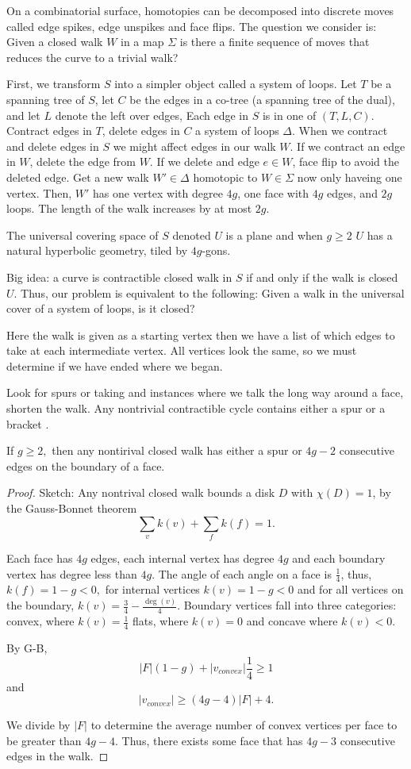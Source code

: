 On a combinatorial surface, homotopies can be decomposed
into discrete moves called edge spikes, edge unspikes  and face flips.
The question we consider is: Given a closed walk $W$ in a map $\Sigma$ is there a finite
sequence of moves that reduces the curve to a trivial walk?


First, we transform $S$ into a simpler object called a system of loops.  
Let $T$ be a spanning tree of $S$, let $C$ be the edges in a co-tree
(a spanning tree of the dual), and let $L$ denote the left over edges,
Each edge in $S$ is in one of $(T,L,C)$.
Contract edges in $T$, delete edges in $C$ a system of loops $\Delta$.
When we contract and delete edges in $S$ we might affect edges in our walk $W$.
If we contract an edge in $W$, delete the edge from $W$.
If we delete and edge $e\in W$, face flip to avoid the deleted edge.
Get a new walk $W' \in \Delta$ homotopic to $W\in \Sigma$
now only haveing one vertex. Then, $W'$ has one vertex
with degree $4g$, one face with $4g$ edges, and $2g$ loops.
The length of the walk increases by at most $2g$.


The universal covering space of $S$ denoted $U$ is a plane
and when $g\geq 2$ $U$ has a natural hyperbolic geometry,
tiled by $4g$-gons.


Big idea: a curve is contractible closed walk in $S$
if and only if the walk is closed $U$.
Thus, our problem is equivalent to the following: Given a walk
in the universal cover of a system of loops, is it closed?

Here the walk is given as a starting vertex then we have a list of which
edges to take at each intermediate vertex. 
All vertices look the same, so we must determine if we have ended where
we began. 

Look for spurs or taking and instances where we talk the long way around a face, 
shorten the walk.
Any nontrivial contractible cycle contains either a spur or a bracket \cite{gertsen-short-1990}.
\begin{lemma}\label{lem:dehn}
If $g\geq 2,$ then any nontirival closed walk has either a spur
or $4g-2$ consecutive edges on the boundary of a face.
\end{lemma}
\begin{proof}
Sketch: 
Any nontrival closed walk bounds a disk $D$ with $\chi(D)=1$, by the Gauss-Bonnet theorem
$$\sum_v k(v)+\sum_f k(f) =1.$$

Each face has $4g$ edges, each internal vertex has degree $4g$
and each  boundary vertex  has degree less than $4g$.
The angle of each angle on a face  is $\frac{1}{4}$,
thus, $k(f)=1-g<0,$ for internal vertices  $k(v)=1-g<0$ and for all
vertices on the boundary, $k(v)=\frac{3}{4}-\frac{\deg(v)}{4}$.
Boundary vertices fall into three  categories: convex, where $k(v)=\frac{1}{4}$
flats,  where $k(v)=0$  and concave where $k(v)<0$.

By G-B, $$|F|(1-g)+|v_{convex}|\frac{1}{4}\geq 1$$
and 
$$|v_{convex}|\geq (4g-4)|F|+4.$$

We divide by $|F|$ to determine the average number
of convex vertices per face to be greater than $4g-4$.
Thus, there exists some face that has $4g-3$ consecutive edges in the walk.
\end{proof}

